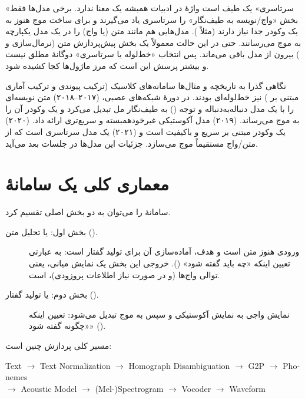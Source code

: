 \begin{correctionbox}{«سرتاسری» یک طیف است}
واژهٔ  در ادبیات  همیشه یک معنا ندارد. برخی مدل‌ها فقط بخش «واج/نویسه به طیف‌نگار» را سرتاسری یاد می‌گیرند و برای ساخت موج هنوز به یک وکودر جدا نیاز دارند (مثلاً ). مدل‌هایی هم مانند  متن (یا واج) را در یک مدل یکپارچه به موج می‌رسانند. حتی در این حالت معمولاً یک بخش پیش‌پردازش متن (نرمال‌سازی و ) بیرون از مدل باقی می‌ماند. پس انتخاب «خط‌لوله یا سرتاسری» دوگانهٔ مطلق نیست و بیشتر پرسش این است که مرز ماژول‌ها کجا کشیده شود.
\end{correctionbox}

\begin{addedbox}{نگاهی گذرا به تاریخچه و مثال‌ها}
سامانه‌های کلاسیک  (ترکیب پیوندی  و ترکیب آماری مبتنی بر ) نیز خط‌لوله‌ای بودند. در دورهٔ شبکه‌های عصبی،  (۲۰۱۷–۲۰۱۸) متن نویسه‌ای را با یک مدل دنباله‌به‌دنباله و توجه () به طیف‌نگار مل تبدیل می‌کرد و یک وکودر  آن را به موج می‌رساند.  (۲۰۱۹) مدل آکوستیکی غیرخودهمبسته و سریع‌تری ارائه داد.  (۲۰۲۰) یک وکودر مبتنی بر  سریع و باکیفیت است و  (۲۰۲۱) یک مدل سرتاسری است که از متن/واج مستقیماً موج می‌سازد. جزئیات این مدل‌ها در جلسات بعد می‌آید.
\end{addedbox}

\section{معماری کلی یک سامانهٔ }

سامانهٔ  را می‌توان به دو بخش اصلی تقسیم کرد.

\begin{description}
  \item[بخش اول:  یا تحلیل متن ().] ورودی هنوز متن است و هدف، آماده‌سازی آن برای تولید گفتار است: به عبارتی تعیین اینکه «چه باید گفته شود» (). خروجی این بخش یک نمایش میانی، یعنی توالی واج‌ها (و در صورت نیاز اطلاعات پروزودی)، است.
  \item[بخش دوم:  یا تولید گفتار ().] نمایش واجی به نمایش آکوستیکی و سپس به موج تبدیل می‌شود: تعیین اینکه «چگونه گفته شود» ().
\end{description}

مسیر کلی پردازش چنین است:
\begin{center}
\begin{latin}
\small Text $\to$ Text Normalization $\to$ Homograph Disambiguation $\to$ G2P $\to$ Phonemes\\
$\to$ Acoustic Model $\to$ (Mel-)Spectrogram $\to$ Vocoder $\to$ Waveform
\end{latin}
\end{center}

